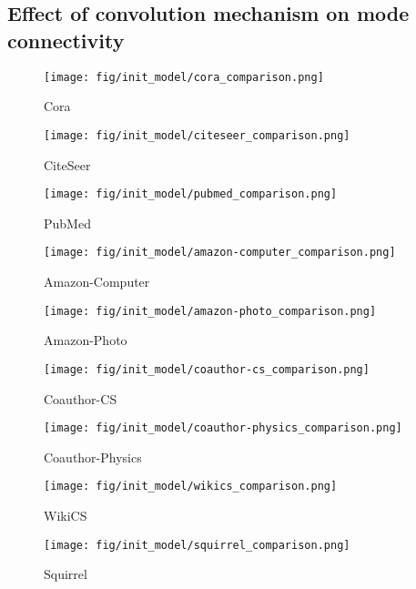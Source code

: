 \subsection{Effect of convolution mechanism on mode connectivity}
\label{app: conv}
\begin{figure*}[!ht]
    \centering
    \begin{subfigure}[b]{0.24\textwidth}
        \texttt{[image: fig/init\_model/cora\_comparison.png]}
        \caption{Cora}
    \end{subfigure}
    \begin{subfigure}[b]{0.24\textwidth}
        \texttt{[image: fig/init\_model/citeseer\_comparison.png]}
        \caption{CiteSeer}
    \end{subfigure}
    \begin{subfigure}[b]{0.24\textwidth}
        \texttt{[image: fig/init\_model/pubmed\_comparison.png]}
        \caption{PubMed}
    \end{subfigure}
    \begin{subfigure}[b]{0.24\textwidth}
        \texttt{[image: fig/init\_model/amazon-computer\_comparison.png]}
        \caption{Amazon-Computer}
    \end{subfigure}
    \begin{subfigure}[b]{0.24\textwidth}
        \texttt{[image: fig/init\_model/amazon-photo\_comparison.png]}
        \caption{Amazon-Photo}
    \end{subfigure}
    \begin{subfigure}[b]{0.24\textwidth}
        \texttt{[image: fig/init\_model/coauthor-cs\_comparison.png]}
        \caption{Coauthor-CS}
    \end{subfigure}
    \begin{subfigure}[b]{0.24\textwidth}
        \texttt{[image: fig/init\_model/coauthor-physics\_comparison.png]}
        \caption{Coauthor-Physics}
    \end{subfigure}
    \begin{subfigure}[b]{0.24\textwidth}
        \texttt{[image: fig/init\_model/wikics\_comparison.png]}
        \caption{WikiCS}
    \end{subfigure}
    \begin{subfigure}[b]{0.24\textwidth}
        \texttt{[image: fig/init\_model/squirrel\_comparison.png]}
        \caption{Squirrel}
    \end{subfigure}

\end{figure*}
